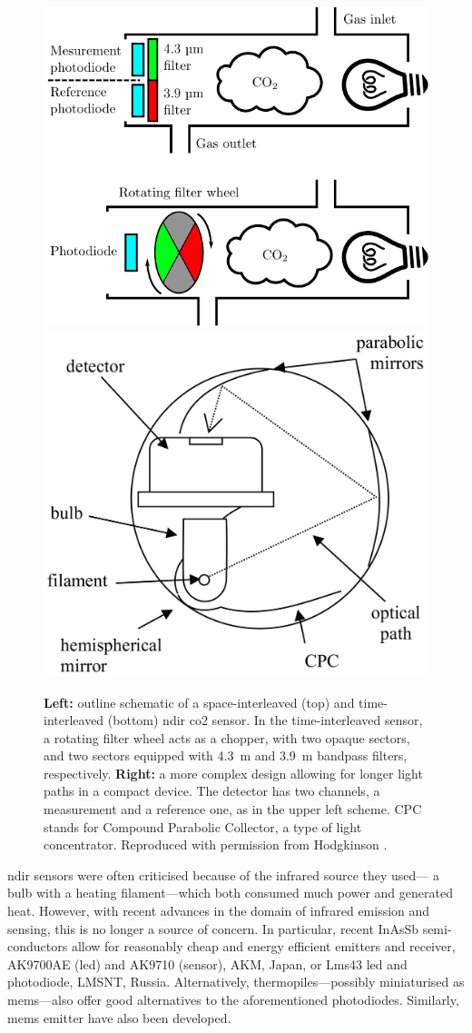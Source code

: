 \begin{figure}
	\centering
	\includegraphics[valign=c,width=.55\linewidth]{1_main_matter/choos_figures/review/ndir_outline_converted}
	\includegraphics[valign=c,width=.44\linewidth]{1_main_matter/choos_figures/review/ndir_long_path}
	\caption[\gls{ndir} sensors outlines.]{\textbf{Left:} outline schematic of a space-interleaved (top) and time-interleaved (bottom) \gls{ndir} \gls{co2} sensor. In the time-interleaved sensor, a rotating filter wheel acts as a chopper, with two opaque sectors, and two sectors equipped with 4.3~\textmu{}m and 3.9~\textmu{}m bandpass filters, respectively. \textbf{Right:} a more complex design allowing for longer light paths in a compact device. The detector has two channels, a measurement and a reference one, as in the upper left scheme. CPC stands for Compound Parabolic Collector, a type of light concentrator. Reproduced with permission from Hodgkinson \etal{}\cite{hodgkinson2013}.}
	\label{fig:choos:review:ndir_sensor_scheme}
\end{figure}

\gls{ndir} sensors were often criticised because of the infrared source they used---{\ie} a bulb with a heating filament---which both consumed much power and generated heat\cite{gibson2013}. However, with recent advances in the domain of infrared emission and sensing, this is no longer a source of concern. In particular, recent InAsSb semi-conductors allow for reasonably cheap and energy efficient emitters and receiver, {\eg} AK9700AE (\gls{led}) and AK9710 (sensor), AKM, Japan, or Lms43 \gls{led} and photodiode, LMSNT, Russia. Alternatively, thermopiles---possibly miniaturised as \gls{mems}---also offer good alternatives to the aforementioned photodiodes\cite{xu2017}. Similarly, \gls{mems} emitter have also been developed\cite{lee2009, liu2016}.

